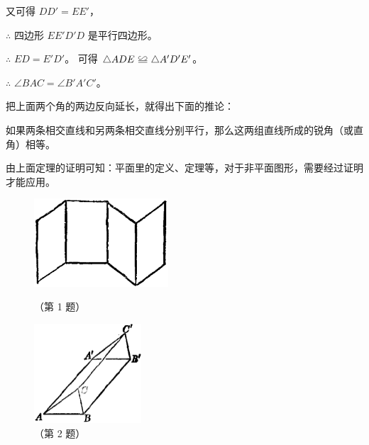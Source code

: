\begin{enhancedline}
又可得  $DD' = EE'$，

$\therefore$ \quad 四边形 $EE'D'D$ 是平行四边形。

$\therefore$ \quad $ED = E'D'$。 可得 $\triangle ADE \quandeng \triangle A'D'E'$。

$\therefore$ \quad $\angle BAC = \angle B'A'C'$。

把上面两个角的两边反向延长，就得出下面的推论：

\begin{tuilun}[推论]
    如果两条相交直线和另两条相交直线分别平行，那么这两组直线所成的锐角（或直角）相等。
\end{tuilun}

\zhuyi 由上面定理的证明可知：平面里的定义、定理等，对于非平面图形，需要经过证明才能应用。


\begin{lianxi}


\begin{figure}[htbp]
    \centering
    \begin{minipage}[b]{7cm}
        \centering
        \includegraphics[width=5cm]{../pic/ltjh-ch1-subsec5-lx-01.png}
        \caption*{（第 1 题）}
    \end{minipage}
    \qquad
    \begin{minipage}[b]{7cm}
        \centering
        \includegraphics[width=4cm]{../pic/ltjh-ch1-subsec5-lx-02.png}
        \caption*{（第 2 题）}
    \end{minipage}
\end{figure}


\end{lianxi}

\end{enhancedline}
